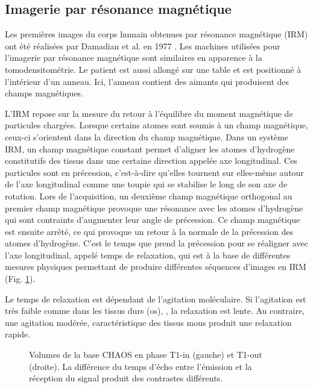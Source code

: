 \subsection{Imagerie par résonance magnétique}
\label{sec:contexte:images:irm}

Les premières images du corps humain obtenues par résonance magnétique (IRM) ont été réalisées par Damadian et al. en 1977 \cite{Damadian1977_NMRI}. Les machines utilisées pour l'imagerie par résonance magnétique sont similaires en apparence à la tomodensitométrie. Le patient est aussi allongé sur une table et est positionné à l'intérieur d'un anneau. Ici, l'anneau contient des aimants qui produisent des champs magnétiques.

L'IRM repose sur la mesure du retour à l'équilibre du moment magnétique de particules chargées. Lorsque certains atomes sont soumis à un champ magnétique, ceux-ci s'orientent dans la direction du champ magnétique. Dans un système IRM, un champ magnétique constant permet d'aligner les atomes d'hydrogène constitutifs des tissus dans une certaine direction appelée axe longitudinal. Ces particules sont en précession, c'est-à-dire qu'elles tournent sur elles-même autour de l'axe longitudinal comme une toupie qui se stabilise le long de son axe de rotation. Lors de l'acquisition, un deuxième champ magnétique orthogonal au premier champ magnétique provoque une résonance avec les atomes d'hydrogène qui sont contraints d'augmenter leur angle de précession. Ce champ magnétique est ensuite arrêté, ce qui provoque un retour à la normale de la précession des atomes d'hydrogène. C'est le temps que prend la précession pour se réaligner avec l'axe longitudinal, appelé temps de relaxation, qui est à la base de différentes mesures physiques permettant de produire différentes séquences d'images en IRM (Fig. \ref{fig:T1_MRI}).

Le temps de relaxation est dépendant de l'agitation moléculaire. Si l'agitation est très faible comme dans les tissus durs (os), , la relaxation est lente. Au contraire, une agitation modérée, caractéristique des tissus mous produit une relaxation rapide.

\begin{figure}
    \centering
    \caption{Volumes de la base CHAOS en phase T1-in (gauche) et T1-out (droite). La différence du temps d'écho entre l'émission et la réception du signal produit des contrastes différents.}
    \label{fig:T1_MRI}
\end{figure}

